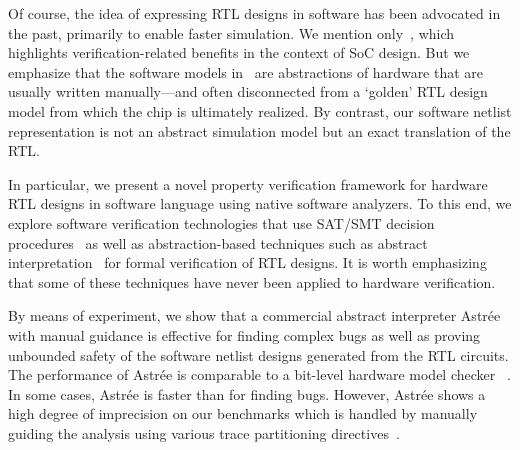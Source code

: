 Of course, the idea of expressing RTL designs in software has been  advocated in the past, primarily to enable faster simulation. We mention only~\cite{soc-keating}, which highlights verification-related benefits in the context of SoC design.  But we emphasize that the software models in~\cite{soc-keating} are abstractions of hardware that are usually written manually---and often disconnected from a `golden' RTL design model from which the chip is ultimately realized.  By contrast, our software netlist representation is not an abstract simulation model but an exact translation of the RTL. 

In particular, we present a novel property verification framework 
for hardware RTL designs in software language using native 
software analyzers.  To this end, we explore software verification 
technologies that use SAT/SMT decision procedures~\cite{DBLP:conf/cav/BeyerK11,
2ls,cbmc.tacas:2004,DBLP:conf/tacas/HeizmannDGLMSP16} as well as abstraction-based 
techniques such as abstract interpretation~\cite{CC79} for formal verification 
of RTL designs.  It is worth emphasizing that some of these techniques 
have never been applied to hardware verification.  
%

By means of experiment, we show that a commercial abstract interpreter  
Astr{\'e}e with manual guidance is effective for finding complex bugs 
as well as proving unbounded safety of the software netlist designs 
generated from the RTL circuits.  The performance of Astr{\'e}e is 
comparable to a bit-level hardware model checker \ABC~\cite{abc}.  
%
In some cases, Astr{\'e}e is faster than \ABC for finding bugs. 
%
However, Astr{\'e}e shows a high degree of imprecision on our benchmarks 
which is handled by manually guiding the analysis using various trace 
partitioning directives~\cite{DBLP:journals/toplas/RivalM07}.  
%
